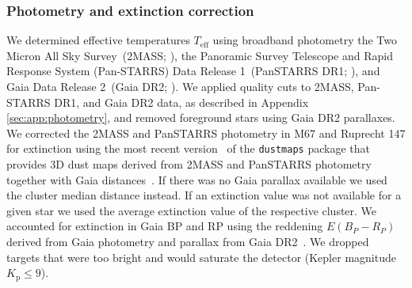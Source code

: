 \documentclass{aa}
\begin{document}
\subsubsection{Photometry and extinction correction}
We determined effective temperatures $T_\mathrm{eff}$ using broadband photometry the Two Micron All Sky Survey~(2MASS; \citealt{skrutskie_two_2006}), the Panoramic Survey Telescope and Rapid Response System \mbox{(Pan-STARRS)} Data Release 1~(PanSTARRS DR1; \citealt{2016arXiv161205560C}), and Gaia Data Release 2~(Gaia DR2; \citealt{gaia_dr2_release_2018}). We applied quality cuts to 2MASS, Pan-STARRS DR1, and Gaia DR2 data, as described in Appendix \ref{sec:app:photometry}, and removed foreground stars using Gaia DR2 parallaxes. We corrected the 2MASS and PanSTARRS photometry in M67 and Ruprecht 147 for extinction using the most recent version~\citep{green_bayestar_2019} of the \texttt{dustmaps} package that provides 3D dust maps derived from 2MASS and PanSTARRS photometry together with Gaia distances~\citep{green_dustmaps_2018}. If there was no Gaia parallax available we used the cluster median distance instead. If an extinction value was not available for a given star we used the average extinction value of the respective cluster. We accounted for extinction in Gaia BP and RP using the reddening $E(B_P-R_P)$ derived from Gaia photometry and parallax from Gaia DR2~\citep{andrae_gaiaapsis_2018}. We dropped targets that were too bright and would saturate the detector (Kepler magnitude $K_\mathrm{p} \leq 9$).
\\
\end{document}
